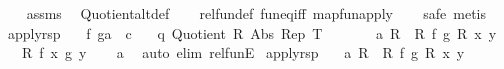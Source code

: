 \begin{isabellebody}
%
\isadelimproof
\ \ %
\endisadelimproof
%
\isatagproof
{}\isamarkupfalse%
\ assms\ \isamarkupfalse%
\ Quotient{\isacharunderscore}{\kern0pt}alt{\isacharunderscore}{\kern0pt}def{}\isanewline
\ \ \isamarkupfalse%
\ rel{\isacharunderscore}{\kern0pt}fun{\isacharunderscore}{\kern0pt}def\ fun{\isacharunderscore}{\kern0pt}eq{\isacharunderscore}{\kern0pt}iff\ map{\isacharunderscore}{\kern0pt}fun{\isacharunderscore}{\kern0pt}apply\isanewline
\ \ \isamarkupfalse%
\ {\isacharparenleft}{\kern0pt}safe{\isacharcomma}{\kern0pt}\ metis{\isacharplus}{\kern0pt}{\isacharparenright}{\kern0pt}%
\endisatagproof
{\isafoldproof}%
%
\isadelimproof
\isanewline
%
\endisadelimproof
\isanewline
{}\isamarkupfalse%
\ apply{\isacharunderscore}{\kern0pt}rsp{\isacharcolon}{\kern0pt}\isanewline
\ \ \ f\ g{\isacharcolon}{\kern0pt}{\isacharcolon}{\kern0pt}{\isachardoublequoteopen}{\isacharprime}{\kern0pt}a\ {\isasymRightarrow}\ {\isacharprime}{\kern0pt}c{\isachardoublequoteclose}\isanewline
\ \ \ q{\isacharcolon}{\kern0pt}\ {\isachardoublequoteopen}Quotient\ R{}\ Abs{}\ Rep{}\ T{}{\isachardoublequoteclose}\isanewline
\ \ \ \ \ \ \ a{\isacharcolon}{\kern0pt}\ {\isachardoublequoteopen}{\isacharparenleft}{\kern0pt}R{}\ {\isacharequal}{\kern0pt}{\isacharequal}{\kern0pt}{\isacharequal}{\kern0pt}{\isachargreater}{\kern0pt}\ R{}{\isacharparenright}{\kern0pt}\ f\ g{\isachardoublequoteclose}\ {\isachardoublequoteopen}R{}\ x\ y{\isachardoublequoteclose}\isanewline
\ \ \ {\isachardoublequoteopen}R{}\ {\isacharparenleft}{\kern0pt}f\ x{\isacharparenright}{\kern0pt}\ {\isacharparenleft}{\kern0pt}g\ y{\isacharparenright}{\kern0pt}{\isachardoublequoteclose}\isanewline
%
\isadelimproof
\ \ %
\endisadelimproof
%
\isatagproof
{}\isamarkupfalse%
\ a\ \isamarkupfalse%
\ {\isacharparenleft}{\kern0pt}auto\ elim{\isacharcolon}{\kern0pt}\ rel{\isacharunderscore}{\kern0pt}funE{\isacharparenright}{\kern0pt}%
\endisatagproof
{\isafoldproof}%
%
\isadelimproof
\isanewline
%
\endisadelimproof
\isanewline
{}\isamarkupfalse%
\ apply{\isacharunderscore}{\kern0pt}rsp{\isacharprime}{\kern0pt}{\isacharcolon}{\kern0pt}\isanewline
\ \ \ a{\isacharcolon}{\kern0pt}\ {\isachardoublequoteopen}{\isacharparenleft}{\kern0pt}R{}\ {\isacharequal}{\kern0pt}{\isacharequal}{\kern0pt}{\isacharequal}{\kern0pt}{\isachargreater}{\kern0pt}\ R{}{\isacharparenright}{\kern0pt}\ f\ g{\isachardoublequoteclose}\ {\isachardoublequoteopen}R{}\ x\ y{\isachardoublequoteclose}\isanewline

\end{isabellebody}
